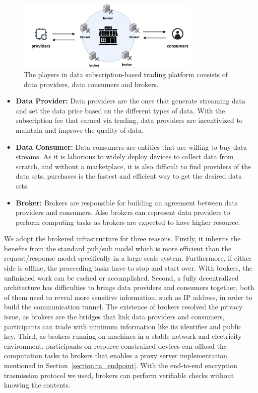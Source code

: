 \documentclass[conference]{IEEEtran}
\begin{document}
\begin{figure}[!t]
    \centering
    \includegraphics[width=3.5in]{pub_sub_model}
    \caption{The players in data subscription-based trading platform consists of data providers, data consumers and brokers.}
    \label{fig:pub_sub_model}
\end{figure}

\begin{itemize}
\item \textbf{Data Provider: }
Data providers are the ones that generate streaming data and set the data price based on the different types of data. With the subscription fee that earned via trading, data providers are incentivized to maintain and improve the quality of data.
\item \textbf{Data Consumer: }
Data consumers are entities that are willing to buy data streams. As it is laborious to widely deploy devices to collect data from scratch, and without a marketplace, it is also difficult to find providers of the data sets, purchases is the fastest and efficient way to get the desired data sets.
\item \textbf{Broker: }
Brokers are responsible for building an agreement between data providers and consumers. Also brokers can represent data providers to perform computing tasks as brokers are expected to have higher resource.
\end{itemize}

We adopt the brokered infrastructure for three reasons. Firstly, it inherits the benefits from the standard pub/sub model which is more efficient than the request/response model specifically in a large scale system. Furthermore, if either side is offline, the proceeding tasks have to stop and start over. With brokers, the unfinished work can be cached or accomplished. Second, a fully decentralized architecture has difficulties to brings data providers and consumers together, both of them need to reveal more sensitive information, such as IP address, in order to build the communication tunnel. The existence of brokers resolved the privacy issue, as brokers are the bridges that link data providers and consumers, participants can trade with minimum information like its identifier and public key. Third, as brokers running on machines in a stable network and electricity environment, participants on resource-constrained devices can offload the computation tasks to brokers that enables a proxy server implementation mentioned in Section~\ref{section:ta_endpoint}. With the end-to-end encryption trasmission protocol we used, brokers can perform verifiable checks without knowing the contents.
\end{document}
